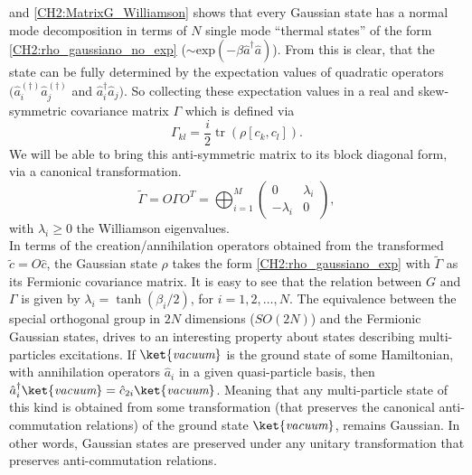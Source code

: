 and \eqref{CH2:MatrixG_Williamson} shows that every Gaussian state has a normal mode decomposition in terms of $N$ single mode ``thermal states'' of the form \eqref{CH2:rho_gaussiano_no_exp} ($\sim \text{exp}(-\beta \hat{a}^{\dagger}\hat{a})$)\cite{kraus_pairing_2009}. From this is clear, that the state can be fully determined by the expectation values of quadratic operators $(\hat{a}_i^{(\dagger)}\hat{a}_j^{(\dagger)}$ and  $\hat{a}^{\dagger}_i\hat{a}_j)$. So collecting these expectation values in a real and skew-symmetric covariance matrix $\Gamma$ which is defined via
\begin{equation}
\Gamma_{k l}=\frac{i}{2} \operatorname{tr}\left(\rho\left[c_{k}, c_{l}\right]\right).
\label{CH2:Cov_matrix_elements}
\end{equation}
We will be able to bring this anti-symmetric matrix to its block diagonal form, via a canonical transformation.
\begin{equation}
\tilde{\Gamma} = O \Gamma O^{T}=\bigoplus_{i=1}^{M}\left(\begin{array}{cc}
0 & \lambda_{i} \\
-\lambda_{i} & 0
\end{array}\right),
\label{CH2:Williamson_Cov_fermionic_matrix}
\end{equation}
with $\lambda_i\geq 0$ the Williamson eigenvalues.\\
In terms of the creation/annihilation operators obtained from the transformed $\tilde{c}=O\hat{c}$, the Gaussian state $\rho$ takes the form \eqref{CH2:rho_gaussiano_exp} with $\tilde{\Gamma}$ as its Fermionic covariance matrix. It is easy to see that the relation between $G$ and $\Gamma$ is given by $\lambda_{i} = \tanh{\left(\beta_{i}/2\right)}$, for $i=1,2,\ldots,N$\cite{kraus_pairing_2009}. 
\newline
The equivalence between the special orthogonal group in $2N$ dimensions ($SO(2N)$) and the Fermionic Gaussian states, drives to an interesting  property about states describing multi-particles excitations. If $\ket{\textit{vacuum}}$ is the ground state of some Hamiltonian, with annihilation operators $\hat{a}_{i}$ in a given quasi-particle basis, then $\hat{a}_{i}^{\dagger}\ket{\textit{vacuum}} = \hat{c}_{2i}\ket{\textit{vacuum}}$. Meaning that any multi-particle state of this kind is obtained from some transformation (that preserves the canonical anti-commutation relations) of the ground state $\ket{\textit{vacuum}}$, remains Gaussian. In other words, Gaussian states are preserved under any unitary transformation that preserves anti-commutation relations.
